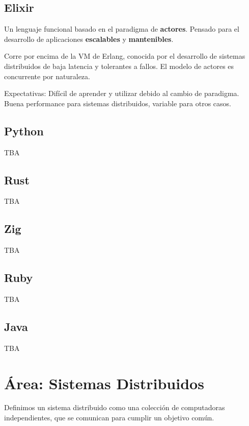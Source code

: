 \documentclass[11pt]{article}
\let\Oldsection\section
\renewcommand{\section}{\FloatBarrier\Oldsection}
\let\Oldsubsection\subsection
\renewcommand{\subsection}{\FloatBarrier\Oldsubsection}
\begin{document}
\subsection{Elixir}

Un lenguaje funcional basado en el paradigma de \textbf{actores}. Pensado para el desarrollo de aplicaciones \textbf{escalables} y \textbf{mantenibles}.

Corre por encima de la VM de Erlang, conocida por el desarrollo de sistemas distribuidos de baja latencia y tolerantes a fallos. El modelo de actores es concurrente por naturaleza.

Expectativas: Difícil de aprender y utilizar debido al cambio de paradigma. Buena performance para sistemas distribuidos, variable para otros casos.

\subsection{Python}

TBA

\subsection{Rust}

TBA

\subsection{Zig}

TBA

\subsection{Ruby}

TBA


\subsection{Java}

TBA

\newpage

\section{Área: Sistemas Distribuidos}

Definimos un sistema distribuido como una colección de computadoras independientes, que se comunican para cumplir un objetivo común.
\end{document}
